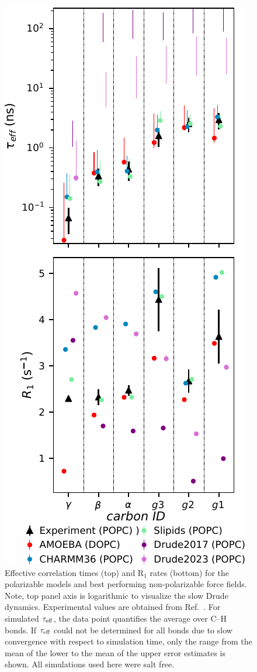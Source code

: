 \documentclass[journal=jctcce,manuscript=article,layout=singlecolumn]{achemso}
\begin{document}
\begin{figure}[!hbt]
	\centering
	\includegraphics{Figures/both_inkscp.pdf}
	\caption{Effective correlation times (top) and R$_1$ rates (bottom) for the polarizable models and best performing non-polarizable force fields. Note, top panel axis is logarithmic to visualize the slow Drude dynamics. Experimental values are obtained from Ref.~. For simulated $\tau_{\rm{eff}}$, the data point quantifies
the average over C–H bonds. If $\tau_{\rm{eff}}$ could not be determined for all bonds due to slow convergence with respect to simulation time, only the range from the mean of the lower to the mean of the upper error estimates is shown. All simulations used here were salt free.}
	\label{fig:correlation_times}
\end{figure}
\end{document}
